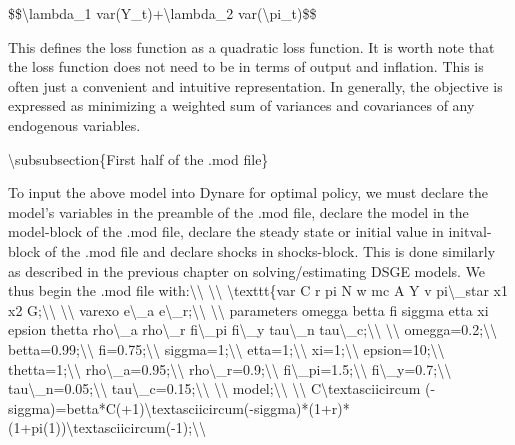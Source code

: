 \documentclass[10pt,math=newtx,citestyle=gb7714-2015,bibstyle=gb7714-2015]{elegantbook}
\begin{document}
	\$\$\textbackslash{}lambda\_1 var(Y\_t)+\textbackslash{}lambda\_2 var(\textbackslash{}pi\_t)\$\$
	
	This defines the loss function as a quadratic loss function. It is worth note that the loss function does not need to be in terms of output and inflation. This is often just a convenient and intuitive representation. In generally, the objective is expressed as minimizing a weighted sum of variances and covariances of any endogenous variables.
	
	\textbackslash{}subsubsection\{First half of the .mod file\}
	
	To input the above model into Dynare for optimal policy, we must declare the model’s variables in the preamble of the .mod file, declare the model in the model-block of the .mod file, declare the steady state or initial value in initval-block of the .mod file and declare shocks in shocks-block. This is done similarly as described in the previous chapter on solving/estimating DSGE models. We thus begin the .mod file with:\textbackslash{}\textbackslash{}
	\textbackslash{}\textbackslash{}
	\textbackslash{}texttt\{var C r pi N w mc A Y v pi\textbackslash{}\_star x1 x2 G;\textbackslash{}\textbackslash{}
	\textbackslash{}\textbackslash{}
	varexo e\textbackslash{}\_a e\textbackslash{}\_r;\textbackslash{}\textbackslash{}
	\textbackslash{}\textbackslash{}
	parameters omegga betta fi siggma etta xi epsion thetta rho\textbackslash{}\_a rho\textbackslash{}\_r fi\textbackslash{}\_pi fi\textbackslash{}\_y tau\textbackslash{}\_n tau\textbackslash{}\_c;\textbackslash{}\textbackslash{}
	\textbackslash{}\textbackslash{}
	omegga=0.2;\textbackslash{}\textbackslash{}
	betta=0.99;\textbackslash{}\textbackslash{}
	fi=0.75;\textbackslash{}\textbackslash{}
	siggma=1;\textbackslash{}\textbackslash{}
	etta=1;\textbackslash{}\textbackslash{}
	xi=1;\textbackslash{}\textbackslash{}
	epsion=10;\textbackslash{}\textbackslash{}
	thetta=1;\textbackslash{}\textbackslash{}
	rho\textbackslash{}\_a=0.95;\textbackslash{}\textbackslash{}
	rho\textbackslash{}\_r=0.9;\textbackslash{}\textbackslash{}
	fi\textbackslash{}\_pi=1.5;\textbackslash{}\textbackslash{}
	fi\textbackslash{}\_y=0.7;\textbackslash{}\textbackslash{}
	tau\textbackslash{}\_n=0.05;\textbackslash{}\textbackslash{}
	tau\textbackslash{}\_c=0.15;\textbackslash{}\textbackslash{}
	\textbackslash{}\textbackslash{}
	model;\textbackslash{}\textbackslash{}
	\textbackslash{}\textbackslash{}
	C\textbackslash{}textasciicircum (-siggma)=betta*C(+1)\textbackslash{}textasciicircum(-siggma)*(1+r)*(1+pi(1))\textbackslash{}textasciicircum(-1);\textbackslash{}\textbackslash{}
\end{document}
